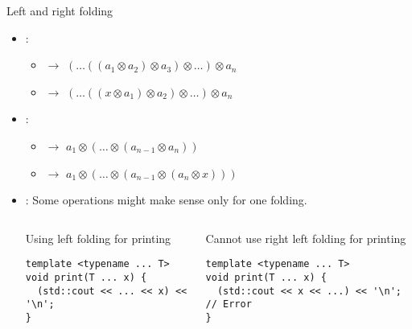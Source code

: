 \begin{frame}[t,fragile]{Left and right folding}
\begin{itemize}
  \item {}:
    \begin{itemize}
      \item {} \quad $\rightarrow$ \quad 
            $(\ldots((a_1 \otimes a_2) \otimes a_3) \otimes \ldots) \otimes a_n$
      \item {} \quad $\rightarrow$ \quad
            $(\ldots((x \otimes a_1) \otimes a_2) \otimes \ldots) \otimes a_n$
    \end{itemize}
  \item {}:
    \begin{itemize}
      \item {} \quad $\rightarrow$ \quad
            $a_1 \otimes (\ldots \otimes (a_{n-1} \otimes a_n))$ 
      \item {} \quad $\rightarrow$ \quad
            $a_1 \otimes (\ldots \otimes (a_{n-1} \otimes (a_n \otimes x)))$ 
    \end{itemize}

  \item {}: Some operations might make sense only for one folding.

\begin{columns}[T]

\begin{block}{Using left folding for printing}
\begin{lstlisting}
template <typename ... T>
void print(T ... x) {
  (std::cout << ... << x) << '\n';
}
\end{lstlisting}
\end{block}

\pause
{}
\begin{block}{Cannot use right left folding for printing}
\begin{lstlisting}
template <typename ... T>
void print(T ... x) {
  (std::cout << x << ...) << '\n'; // Error
}
\end{lstlisting}
\end{block}

\end{columns}
\end{itemize}
\end{frame}

